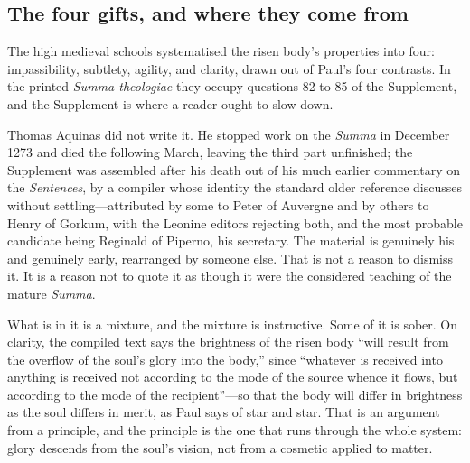 \subsection{The four gifts, and where they come from}

The high medieval schools systematised the risen body's properties into four: impassibility, subtlety, agility, and clarity, drawn out of Paul's four contrasts. In the printed \emph{Summa theologiae} they occupy questions 82 to 85 of the Supplement, and the Supplement is where a reader ought to slow down.

Thomas Aquinas did not write it. He stopped work on the \emph{Summa} in December 1273 and died the following March, leaving the third part unfinished; the Supplement was assembled after his death out of his much earlier commentary on the \emph{Sentences}, by a compiler whose identity the standard older reference discusses without settling---attributed by some to Peter of Auvergne and by others to Henry of Gorkum, with the Leonine editors rejecting both, and the most probable candidate being Reginald of Piperno, his secretary. The material is genuinely his and genuinely early, rearranged by someone else. That is not a reason to dismiss it. It is a reason not to quote it as though it were the considered teaching of the mature \emph{Summa}.

What is in it is a mixture, and the mixture is instructive. Some of it is sober. On clarity, the compiled text says the brightness of the risen body ``will result from the overflow of the soul's glory into the body,'' since ``whatever is received into anything is received not according to the mode of the source whence it flows, but according to the mode of the recipient''---so that the body will differ in brightness as the soul differs in merit, as Paul says of star and star. That is an argument from a principle, and the principle is the one that runs through the whole system: glory descends from the soul's vision, not from a cosmetic applied to matter.


